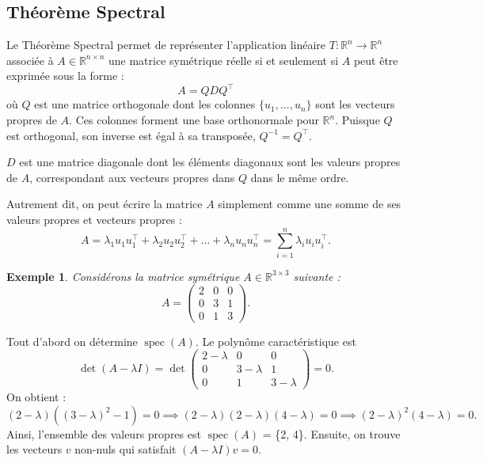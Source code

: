 \documentclass[12pt]{report}
\newtheorem{example}{Exemple}
\begin{document}
\subsection*{Théorème Spectral}
\noindent Le Théorème Spectral permet de représenter l'application linéaire $T : \mathbb{R}^n \to \mathbb{R}^n$ associée à $A \in \mathbb{R}^{n \times n}$ une matrice symétrique réelle si et seulement si $A$ peut être exprimée sous la forme :
\[
    A = QDQ^{\top}
\]
où $Q$ est une {matrice orthogonale} dont les colonnes $\{u_1, \dots, u_n\}$ sont les {vecteurs propres} de $A$. Ces colonnes forment une base orthonormale pour $\mathbb{R}^n$. Puisque $Q$ est orthogonal, son inverse est égal à sa transposée, ${Q^{-1} = Q^{\top}}$.

\noindent $D$ est une {matrice diagonale} dont les éléments diagonaux sont les {valeurs propres} de $A$, correspondant aux vecteurs propres dans $Q$ dans le même ordre.

\noindent Autrement dit, on peut écrire la matrice $A$ simplement comme une somme de ses valeurs propres et vecteurs propres :
\[
    A = \lambda_1 u_1 u_1^\top + \lambda_2 u_2 u_2^\top + \dots + \lambda_n u_n u_n^\top = \sum_{i=1}^{n} \lambda_i u_i u_i^\top.
\]

\begin{example}

    Considérons la matrice symétrique $A\in \mathbb{R}^{3 \times 3}$ suivante :
    \[
        A =
        \begin{pmatrix}
            2 & 0 & 0 \\
            0 & 3 & 1 \\
            0 & 1 & 3
        \end{pmatrix}.
    \]
\end{example}
\noindent Tout d'abord on détermine $\operatorname{spec}(A)$.
Le polynôme caractéristique est
\[
    \det(A - \lambda I) =
    \det
    \begin{pmatrix}
        2-\lambda & 0         & 0         \\
        0         & 3-\lambda & 1         \\
        0         & 1         & 3-\lambda
    \end{pmatrix} = 0.
\]
On obtient :
\[
    (2-\lambda)((3-\lambda)^2 - 1) = 0 \implies (2-\lambda)(2-\lambda)(4-\lambda) = 0 \implies (2-\lambda)^2 (4-\lambda) = 0.
\]
Ainsi, l'ensemble des valeurs propres est $\operatorname{spec}(A)$ = \{2, 4\}.
Ensuite, on trouve les vecteurs $v$ non-nuls qui satisfait $(A - \lambda I)v = 0$.
\end{document}
